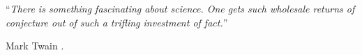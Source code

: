 %
%

\chapter*{}
\begin{SingleSpace}
\vspace*{0.2\textheight}

\noindent\enquote{\itshape There is something fascinating about science. One gets such wholesale returns of conjecture out of such a trifling investment of fact.}\bigbreak

\hfill Mark Twain
.
\end{SingleSpace}
\clearpage